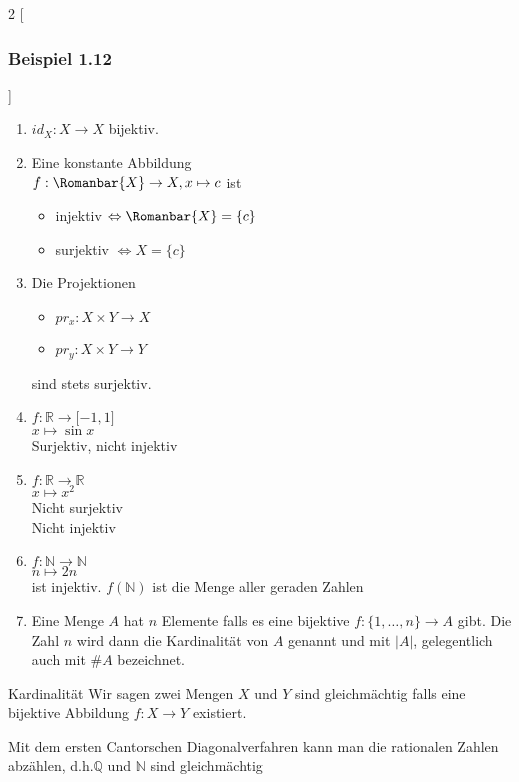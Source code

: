 \begin{multicols}{2}
[\subsubsection*{Beispiel 1.12}]
\begin{enumerate}
\item $id_{X}:X\to X$ bijektiv.
\item Eine konstante Abbildung \\
	$f:\Romanbar{X}\to X, x\mapsto c$ ist 
\begin{itemize}
\item injektiv $\Leftrightarrow \Romanbar{X}=\{ c\}$
\item surjektiv $\Leftrightarrow X=\{ c\}$
\end{itemize}
\item Die Projektionen 
\begin{itemize}
\item $pr_x : X\times Y\to X$ 
\item $pr_y : X\times Y\to Y$ 
\end{itemize}
sind stets surjektiv.
\item $f:\mathbb{R}\to\lbrack -1,1\rbrack$ \\
$x\mapsto \sin x$\\
Surjektiv, nicht injektiv
\columnbreak
\item $f:\mathbb{R}\to\mathbb{R}$\\
$x\mapsto x^2$\\
Nicht surjektiv\\
Nicht injektiv

\item $f:\mathbb{N}\to\mathbb{N}$\\
$n\mapsto 2n$\\
ist injektiv. $f(\mathbb{N})$ ist die Menge aller geraden Zahlen
\item Eine Menge $A$ hat $n$ Elemente falls es eine bijektive ${f:\{1,\dots,n\}\to A}$ gibt. Die Zahl $n$ wird dann die Kardinalität von $A$ genannt und mit $|A|$, gelegentlich auch mit $\#A$ bezeichnet.
\end{enumerate}
\end{multicols}

\begin{definition}{Kardinalität}
Wir sagen zwei Mengen $X$ und $Y$ sind gleichmächtig falls eine bijektive Abbildung $f:X\to Y$ existiert.
\end{definition}

Mit dem ersten Cantorschen Diagonalverfahren kann man die rationalen Zahlen abzählen, d.h.$ \mathbb{Q}$ und $\mathbb{N}$ sind gleichmächtig

